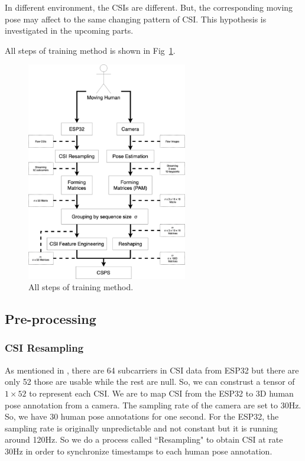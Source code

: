 \documentclass[10pt,letterpaper]{article}
\begin{document}
	In different environment, the CSIs are different. But, the corresponding moving pose may affect to the same changing pattern of CSI. This hypothesis is investigated in the upcoming parts.
	
	
	
	
	
	
	All steps of training method is shown in Fig~\ref{fig:TRAINSTEP}. 
	
	
	\begin{figure}[htbp]
		\centerline{\includegraphics[width=70mm,scale=0.2]{TRAINSTEP06.png}}
		\caption{All steps of training method.}
		\label{fig:TRAINSTEP}
	\end{figure}
	
	
	
	\subsection*{Pre-processing}\label{Processing}
	
	\subsubsection*{CSI Resampling}
	
	
	As mentioned in , there are 64 subcarriers in CSI data from ESP32 but there are only 52 those are usable while the rest are null. So, we can construst a tensor of $1 \times 52$ to represent each CSI. We are to map CSI from the ESP32 to 3D human pose annotation from a camera. The sampling rate of the camera are set to 30Hz. So, we have 30 human pose annotations for one second. For the ESP32, the sampling rate is originally unpredictable and not constant but it is running around 120Hz. So we do a process called ``Resampling" to obtain CSI at rate 30Hz in order to synchronize timestamps to each human pose annotation.
	
\end{document}
